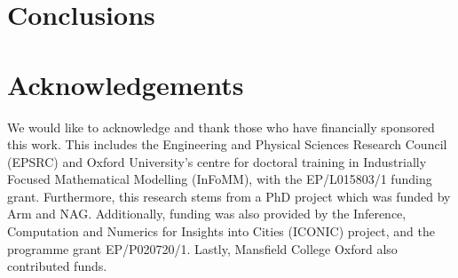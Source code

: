 \documentclass[manuscript,review]{acmart}
\begin{document}
\section{Conclusions}
\label{sec:conclusions}

\section{Acknowledgements}
\label{sec:acknowledgements}

We would like to acknowledge and thank those who have financially sponsored this work. This includes the Engineering and Physical Sciences Research Council (EPSRC) and Oxford University's centre for doctoral training in Industrially Focused Mathematical Modelling (InFoMM), with the EP/L015803/1 funding grant. Furthermore, this research stems from a PhD project \citep{sheridan2020nested} which was funded by Arm and NAG. Additionally, funding was also provided by the Inference, Computation and Numerics for Insights into Cities (ICONIC) project, and the programme grant EP/P020720/1. Lastly, Mansfield College Oxford also contributed funds.  



\end{document}
